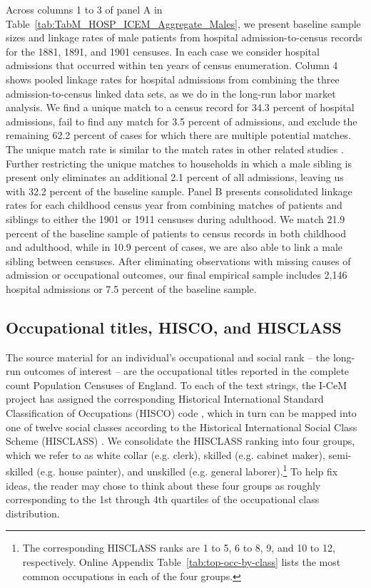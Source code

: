 \documentclass[12pt,english]{article}
\begin{document}
Across columns 1 to 3 of panel A in Table~\ref{tab:TabM_HOSP_ICEM_Aggregate_Males}, we present baseline sample sizes and linkage rates of male patients from hospital admission-to-census records for the 1881, 1891, and 1901 censuses. In each case we consider hospital admissions that occurred within ten years of census enumeration. Column 4 shows pooled linkage rates for hospital admissions from combining the three admission-to-census linked data sets, as we do in the long-run labor market analysis. We find a unique match to a census record for 34.3 percent of hospital admissions, fail to find any match for 3.5 percent of admissions, and exclude the remaining 62.2 percent of cases for which there are multiple potential matches. The unique match rate is similar to the match rates in other related studies \citep{ABE2012,LongFerrie2013}. Further restricting the unique matches to households in which a male sibling is present only eliminates an additional 2.1 percent of all admissions, leaving us with 32.2 percent of the baseline sample. Panel B presents consolidated linkage rates for each childhood census year from combining matches of patients and siblings to either the 1901 or 1911 censuses during adulthood. We match 21.9 percent of the baseline sample of patients to census records in both childhood and adulthood, while in 10.9 percent of cases, we are also able to link a male sibling between censuses. After eliminating observations with missing causes of admission or occupational outcomes, our final empirical sample includes 2,146 hospital admissions or 7.5 percent of the baseline sample. 

\subsection{Occupational titles, HISCO, and HISCLASS}\label{subsec:hisclass}

The source material for an individual's occupational and social rank -- the long-run outcomes of interest -- are the occupational titles reported in the complete count Population Censuses of England. To each of the text strings, the I-CeM project \citep{SchurerHiggs2020} has assigned the corresponding Historical International Standard Classification of Occupations (HISCO) code \citep{Leeuwen2002}, which in turn can be mapped into one of twelve social classes according to the Historical International Social Class Scheme (HISCLASS) \citep{Leeuwen2011}. We consolidate the HISCLASS ranking into four groups, which we refer to as white collar (e.g. clerk), skilled (e.g. cabinet maker), semi-skilled (e.g. house painter), and unskilled (e.g. general laborer).\footnote{The corresponding HISCLASS ranks are 1 to 5, 6 to 8, 9, and 10 to 12, respectively. Online Appendix Table~\ref{tab:top-occ-by-class} lists the most common occupations in each of the four groups.} To help fix ideas, the reader may chose to think about these four groups as roughly corresponding to the 1st through 4th quartiles of the occupational class distribution. 
\end{document}

